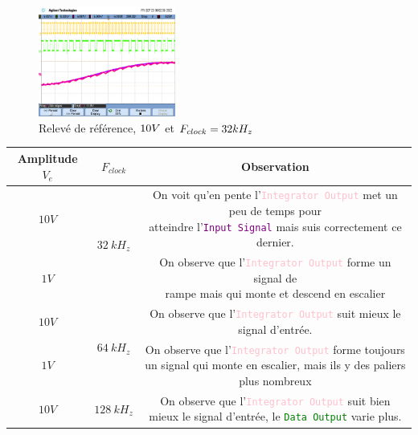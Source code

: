 \documentclass[11pt, openright]{book}
\begin{document}
\begin{figure}[ht!]
    \centering
    \includegraphics[width=0.4\textwidth]{./object/g4.png}
    \caption{Relevé de référence, $\color{black}10V$ et $\color{black} F_{clock}=32kH_z$}
\end{figure}
\begin{center}
    \begin{tabular}{c|c|c}
        Amplitude $V_e$ & $F_{clock}$                  & Observation                                                                                           \\
        \hline
        $10V$           & \multirow{2}{*}{$32\ kH_z$}  & \makecell{On voit qu'en pente l'\textcolor{pink}{\texttt{Integrator Output}} met un peu de temps pour \\ atteindre  l'\textcolor{purple}{\texttt{Input Signal}} mais suis correctement ce\\ dernier.}\\
        \cline{1-1}\cline{3-3}
        $1V$            &                              & \makecell{On observe que l'\textcolor{pink}{\texttt{Integrator Output}} forme un signal de            \\ rampe mais qui monte et descend en escalier}\\
        \hline
        $10V$           & \multirow{2}{*}{$64\ kH_z$}  & \makecell{On observe que l'\textcolor{pink}{\texttt{Integrator Output}} suit mieux le                 \\ signal d’entrée.}\\
        \cline{1-1}\cline{3-3}
        $1V$            &                              & \makecell{On observe que l'\textcolor{pink}{\texttt{Integrator Output}} forme toujours                \\ un signal qui monte en escalier, mais ils y des paliers\\ plus nombreux}\\
        \hline
        $10V$           & \multirow{2}{*}{$128\ kH_z$} & \makecell{On observe que l'\textcolor{pink}{\texttt{Integrator Output}} suit bien                     \\ mieux le signal d’entrée, le \textcolor{green}{\texttt{Data Output}} varie plus.}\\

\end{tabular}
\end{center}
\end{document}
